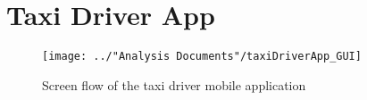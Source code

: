 \section{Taxi Driver App}
\begin{figure}
	\centering
	\texttt{[image: ../"Analysis Documents"/taxiDriverApp\_GUI]}
	\caption{Screen flow of the taxi driver mobile application}
	\label{fig:screenFlow:taxiDriverApp}
\end{figure}